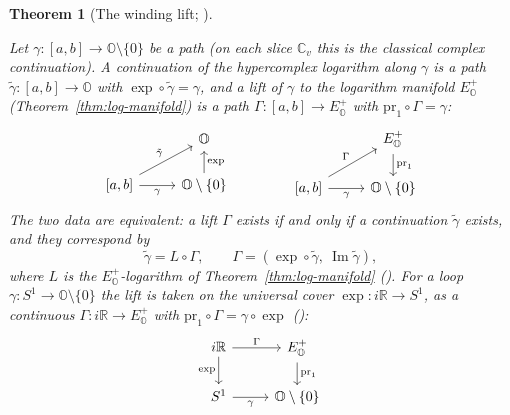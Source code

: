 \documentclass[11pt]{article}
\newcommand{\OO}{\mathbb{O}}
\newcommand{\CC}{\mathbb{C}}
\newcommand{\RR}{\mathbb{R}}
\DeclareMathOperator{\im}{Im}
\providecommand{\lean}[1]{}
\providecommand{\uses}[1]{}
\theoremstyle{plain}
\newtheorem{theorem}{Theorem}[section]
\theoremstyle{definition}
\theoremstyle{remark}
\begin{document}
\begin{theorem}[The winding lift; ]\label{thm:winding-lift}
\lean{exists_log_continuation, winding_lift_unique,
Octonion.lift_iff_continuation}
\uses{thm:log-manifold}
Let $\gamma:[a,b]\to\OO\setminus\{0\}$ be a path \textup{(}on each slice $\CC_v$ this is the
classical complex continuation\textup{)}. A \emph{continuation of the hypercomplex logarithm along
$\gamma$} is a path $\tilde\gamma:[a,b]\to\OO$ with $\exp\circ\tilde\gamma=\gamma$, and a \emph{lift
of $\gamma$} to the logarithm manifold $E^{+}_{\OO}$ \textup{(}Theorem~\ref{thm:log-manifold}\textup{)}
is a path $\Gamma:[a,b]\to E^{+}_{\OO}$ with $\mathrm{pr}_1\circ\Gamma=\gamma$:
\[
\begin{tikzcd}[row sep=1.6em, column sep=2.6em]
& \OO\\
{[a,b]} \arrow[ur,"\tilde\gamma"] \arrow[r,"\gamma"'] & \OO\setminus\{0\} \arrow[u,"\exp"']
\end{tikzcd}
\qquad\qquad
\begin{tikzcd}[row sep=1.6em, column sep=2.6em]
& E^{+}_{\OO} \arrow[d,"\mathrm{pr}_1"]\\
{[a,b]} \arrow[ur,"\Gamma"] \arrow[r,"\gamma"'] & \OO\setminus\{0\}
\end{tikzcd}
\]
The two data are \emph{equivalent}: a lift $\Gamma$ exists if and only if a continuation
$\tilde\gamma$ exists, and they correspond by
\[
\tilde\gamma=L\circ\Gamma,\qquad \Gamma=(\exp\circ\tilde\gamma,\ \im\tilde\gamma),
\]
where $L$ is the $E^{+}_{\OO}$-logarithm of Theorem~\ref{thm:log-manifold}
\textup{(}\cite[Prop.~4.2]{GPVwind}\textup{)}. For a \emph{loop} $\gamma:S^1\to\OO\setminus\{0\}$ the
lift is taken on the universal cover $\exp:i\RR\to S^1$, as a continuous $\Gamma:i\RR\to E^{+}_{\OO}$
with $\mathrm{pr}_1\circ\Gamma=\gamma\circ\exp$ \textup{(}\cite[Def.~5.11]{GPVwind}\textup{)}:
\[
\begin{tikzcd}[row sep=1.6em, column sep=2.6em]
i\RR \arrow[r,"\Gamma"] \arrow[d,"\exp"'] & E^{+}_{\OO} \arrow[d,"\mathrm{pr}_1"]\\
S^1 \arrow[r,"\gamma"'] & \OO\setminus\{0\}
\end{tikzcd}
\]
\end{theorem}
\end{document}
